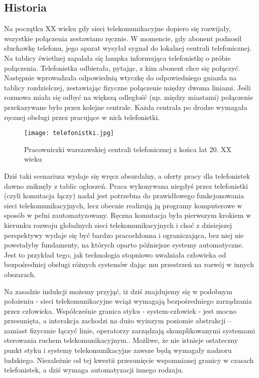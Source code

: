 \subsection{Historia}

Na początku XX wieku gdy sieci telekomunikacyjne dopiero się rozwijały, wszystkie połączenia zestawiano ręcznie. W momencie, gdy abonent podnosił słuchawkę telefonu, jego aparat wysyłał sygnał do lokalnej centrali telefonicznej. Na tablicy świetlnej zapalała się lampka informująca telefonistkę o próbie połączenia. Telefonistka odbierała, pytając, z kim abonent chce się połączyć. Następnie wprowadzała odpowiednią wtyczkę do odpowiedniego gniazda na tablicy rozdzielczej, zestawiając fizyczne połączenie między dwoma liniami. Jeśli rozmowa miała się odbyć na większą odległość (np. między miastami) połączenie przekazywane było przez kolejne centrale. Każda centrala po drodze wymagała ręcznej obsługi przez pracujące w nich telefonistki. 

\begin{figure}[!htbp]
    \centering \texttt{[image: telefonistki.jpg]}
    \caption{Pracowniczki warszawskiej centrali telefonicznej z końca lat 20. XX wieku}\label{fig:telefonistki}
\end{figure}

Dziś taki scenariusz wydaje się wręcz absurdalny, a oferty pracy dla telefonistek dawno zniknęły z tablic ogłoszeń. Praca wykonywana niegdyś przez telefonistki (czyli komutacja łączy) nadal jest potrzebna do prawidłowego funkcjonowania sieci telekomunikacyjnych, lecz obecnie realizują ją programy komputerowe w sposób w pełni zautomatyzowany. Ręczna komutacja była pierwszym krokiem w kierunku rozwoju globalnych sieci telekomunikacyjnych i choć z dzisiejszej perspektywy wydaje się być bardzo pracochłonna i ograniczająca, bez niej nie powstałyby fundamenty, na których oparto późniejsze systemy automatyczne. Jest to przykład tego, jak technologia stopniowo uwalniała człowieka od bezpośredniej obsługi różnych systemów dając mu przestrzeń na rozwój w innych obszarach.

Na zasadzie indukcji możemy przyjąć, iż dziś znajdujemy się w podobnym położeniu - sieci telekomunikacyjne wciąż wymagają bezpośredniego zarządzania przez człowieka. Współcześnie granica styku - system-człowiek - jest mocno przesunięta, a interakcja zachodzi na dużo wyższym poziomie abstrakcji – zamiast fizycznie łączyć linie, operatorzy zarządzają skomplikowanymi systemami sterowania ruchem telekomunikacyjnym.. Możliwe, że nie istnieje ostateczny punkt styku i systemy telekomunikacyjne zawsze będą wymagały nadzoru ludzkiego. Niezależnie od tej kwestii przesunięcie wspomnianej granicy w czasach telefonistek, a dziś wymaga automatyzacji innego rodzaju. 

